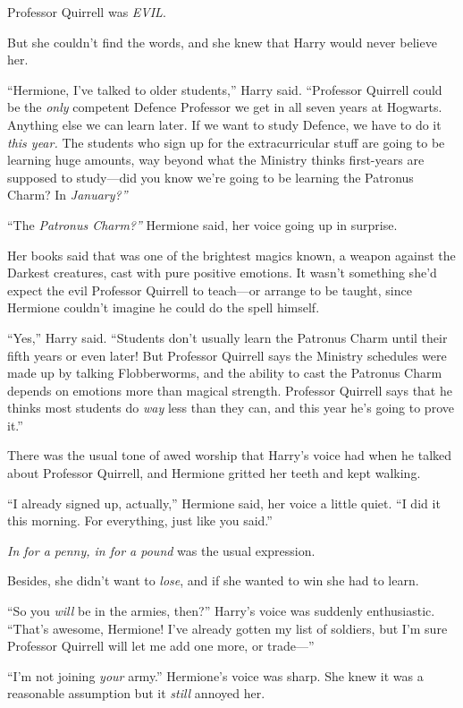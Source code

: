 Professor Quirrell was \emph{EVIL}.

But she couldn't find the words, and she knew that Harry would never
believe her.

``Hermione, I've talked to older students,'' Harry said. ``Professor
Quirrell could be the \emph{only} competent Defence Professor we get in
all seven years at Hogwarts. Anything else we can learn later. If we
want to study Defence, we have to do it \emph{this year.} The students
who sign up for the extracurricular stuff are going to be learning huge
amounts, way beyond what the Ministry thinks first-years are supposed to
study---did you know we're going to be learning the Patronus Charm? In
\emph{January?''}

``The \emph{Patronus Charm?''} Hermione said, her voice going up in
surprise.

Her books said that was one of the brightest magics known, a weapon
against the Darkest creatures, cast with pure positive emotions. It
wasn't something she'd expect the evil Professor Quirrell to teach---or
arrange to be taught, since Hermione couldn't imagine he could do the
spell himself.

``Yes,'' Harry said. ``Students don't usually learn the Patronus Charm
until their fifth years or even later! But Professor Quirrell says the
Ministry schedules were made up by talking Flobberworms, and the ability
to cast the Patronus Charm depends on emotions more than magical
strength. Professor Quirrell says that he thinks most students do
\emph{way} less than they can, and this year he's going to prove it.''

There was the usual tone of awed worship that Harry's voice had when he
talked about Professor Quirrell, and Hermione gritted her teeth and kept
walking.

``I already signed up, actually,'' Hermione said, her voice a little
quiet. ``I did it this morning. For everything, just like you said.''

\emph{In for a penny, in for a pound} was the usual expression.

Besides, she didn't want to \emph{lose}, and if she wanted to win she
had to learn.

``So you \emph{will} be in the armies, then?'' Harry's voice was
suddenly enthusiastic. ``That's awesome, Hermione! I've already gotten
my list of soldiers, but I'm sure Professor Quirrell will let me add one
more, or trade---''

``I'm not joining \emph{your} army.'' Hermione's voice was sharp. She
knew it was a reasonable assumption but it \emph{still} annoyed her.

